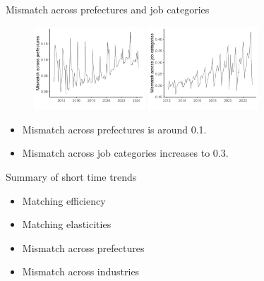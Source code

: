 \documentclass[aspectratio=169]{beamer}
\begin{document}
\begin{frame}{Mismatch across prefectures and job categories}
\begin{figure}[!ht]
  \begin{center}

  \includegraphics[width = 0.37\textwidth]
  {figuretable/mismatch_part_and_full_time_monthly_prefecture.png}
  \includegraphics[width = 0.37\textwidth]
  {figuretable/mismatch_part_and_full_time_monthly_job_category.png}
  \end{center}
  \footnotesize
\end{figure} 
\begin{itemize}
    \item Mismatch across prefectures is around 0.1.
    \item Mismatch across job categories increases to 0.3.
\end{itemize}

\end{frame}


\begin{frame}{Summary of short time trends}
    \begin{itemize}
        \item Matching efficiency
        \item Matching elasticities
        \item Mismatch across prefectures
        \item Mismatch across industries
    \end{itemize}
\end{frame}
\end{document}
